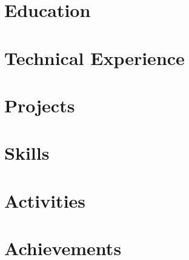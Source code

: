 \documentclass[letter,10pt]{article}
\begin{document}


\section{Education}


\section{Technical Experience}


\section{Projects}


\section{Skills}


\section{Activities}


\section{Achievements}

\end{document}
